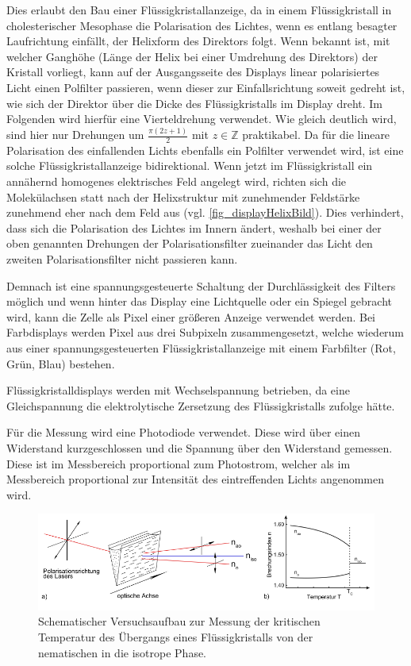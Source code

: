 \documentclass[
	a4paper,
	12pt,
	pagesize,
	ngerman
]{scrartcl}
\begin{document}
	Dies erlaubt den Bau einer Flüssigkristallanzeige, da in einem Flüssigkristall in cholesterischer Mesophase die Polarisation des Lichtes, wenn es entlang besagter Laufrichtung einfällt, der Helixform des Direktors folgt.
	Wenn bekannt ist, mit welcher Ganghöhe (Länge der Helix bei einer Umdrehung des Direktors) der Kristall vorliegt, kann auf der Ausgangsseite des Displays linear polarisiertes Licht einen Polfilter passieren, wenn dieser zur Einfallsrichtung soweit gedreht ist, wie sich der Direktor über die Dicke des Flüssigkristalls im Display dreht.
	Im Folgenden wird hierfür eine Vierteldrehung verwendet. Wie gleich deutlich wird, sind hier nur Drehungen um $\frac{\pi (2z+1)}{2}$ mit $z \in \mathbb{Z}$ praktikabel.
	Da für die lineare Polarisation des einfallenden Lichts ebenfalls ein Polfilter verwendet wird, ist eine solche Flüssigkristallanzeige bidirektional.
	Wenn jetzt im Flüssigkristall ein annähernd homogenes elektrisches Feld angelegt wird, richten sich die Molekülachsen statt nach der Helixstruktur mit zunehmender Feldstärke zunehmend eher nach dem Feld aus (vgl. \cref{fig_displayHelixBild}).
	Dies verhindert, dass sich die Polarisation des Lichtes im Innern ändert, weshalb bei einer der oben genannten Drehungen der Polarisationsfilter zueinander das Licht den zweiten Polarisationsfilter nicht passieren kann.

	Demnach ist eine spannungsgesteuerte Schaltung der Durchlässigkeit des Filters möglich und wenn hinter das Display eine Lichtquelle oder ein Spiegel gebracht wird, kann die Zelle als Pixel einer größeren Anzeige verwendet werden.
	Bei Farbdisplays werden Pixel aus drei Subpixeln zusammengesetzt, welche wiederum aus einer spannungsgesteuerten Flüssigkristallanzeige mit einem Farbfilter (Rot, Grün, Blau) bestehen.

	Flüssigkristalldisplays werden mit Wechselspannung betrieben, da eine Gleichspannung die elektrolytische Zersetzung des Flüssigkristalls zufolge hätte.



	\par
	Für die Messung wird eine Photodiode verwendet.
	Diese wird über einen Widerstand kurzgeschlossen und die Spannung über den Widerstand gemessen.
	Diese ist im Messbereich proportional zum Photostrom, welcher als im Messbereich proportional zur Intensität des eintreffenden Lichts angenommen wird.
	\par

	\begin{figure}[H]
			\includegraphics[width=1\linewidth]{images/keil}
			\caption{Schematischer Versuchsaufbau zur Messung der kritischen Temperatur des Übergangs eines Flüssigkristalls von der nematischen in die isotrope Phase. \cite{imp08}
			}
			\label{fig_keil}
	\end{figure}
\end{document}
